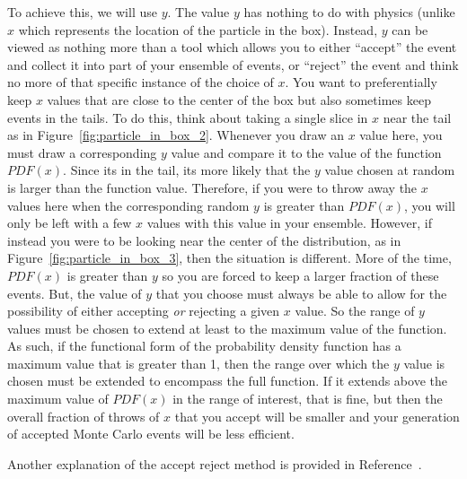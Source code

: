 \documentclass[UKenglish,texlive=2016]{\ATLASLATEXPATH atlasdoc}
\begin{document}
To achieve this, we will use $y$.  The value $y$ has nothing to do with physics (unlike $x$ which represents the location of the particle in the box).  Instead, $y$ can be viewed as nothing more than a tool which allows you to either ``accept'' the event and collect it into part of your ensemble of events, or ``reject'' the event and think no more of that specific instance of the choice of $x$.  You want to preferentially keep $x$ values that are close to the center of the box but also sometimes keep events in the tails.  To do this, think about taking a single slice in $x$ near the tail as in Figure~\ref{fig:particle_in_box_2}.  Whenever you draw an $x$ value here, you must draw a corresponding $y$ value and compare it to the value of the function $PDF(x)$.  Since its in the tail, its more likely that the $y$ value chosen at random is larger than the function value.  Therefore, if you were to throw away the $x$ values here when the corresponding random $y$ is greater than $PDF(x)$, you will only be left with a few $x$ values with this value in your ensemble.  However, if instead you were to be looking near the center of the distribution, as in Figure~\ref{fig:particle_in_box_3}, then the situation is different.  More of the time, $PDF(x)$ is greater than $y$ so you are forced to keep a larger fraction of these events.  But, the value of $y$ that you choose must always be able to allow for the possibility of either accepting \textit{or} rejecting a given $x$ value.  So the range of $y$ values must be chosen to extend at least to the maximum value of the function.  As such, if the functional form of the probability density function has a maximum value that is greater than 1, then the range over which the $y$ value is chosen must be extended to encompass the full function.  If it extends above the maximum value of $PDF(x)$ in the range of interest, that is fine, but then the overall fraction of throws of $x$ that you accept will be smaller and your generation of accepted Monte Carlo events will be less efficient.

Another explanation of the accept reject method is provided in Reference~\cite{acceptreject_video}.

\begin{center}
\end{center}
\end{document}
